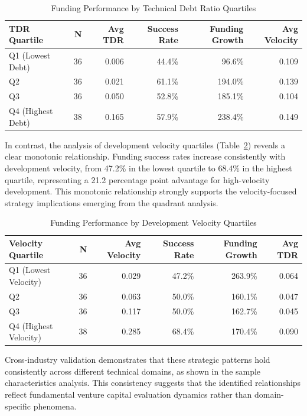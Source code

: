 \begin{table}[htbp]
\centering
\caption{Funding Performance by Technical Debt Ratio Quartiles}
\label{tab:funding_by_tdr}
\begin{tabular}{lrrrrr}
\hline
\textbf{TDR Quartile} & \textbf{N} & \textbf{Avg TDR} & \textbf{Success Rate} & \textbf{Funding Growth} & \textbf{Avg Velocity} \\
\hline
Q1 (Lowest Debt) & 36 & 0.006 & 44.4\% & 96.6\% & 0.109 \\
Q2 & 36 & 0.021 & 61.1\% & 194.0\% & 0.139 \\
Q3 & 36 & 0.050 & 52.8\% & 185.1\% & 0.104 \\
Q4 (Highest Debt) & 38 & 0.165 & 57.9\% & 238.4\% & 0.149 \\
\hline
\end{tabular}
\end{table}

In contrast, the analysis of development velocity quartiles (Table~\ref{tab:funding_by_velocity}) reveals a clear monotonic relationship. Funding success rates increase consistently with development velocity, from 47.2\% in the lowest quartile to 68.4\% in the highest quartile, representing a 21.2 percentage point advantage for high-velocity development. This monotonic relationship strongly supports the velocity-focused strategy implications emerging from the quadrant analysis.

\begin{table}[htbp]
\centering
\caption{Funding Performance by Development Velocity Quartiles}
\label{tab:funding_by_velocity}
\begin{tabular}{lrrrrr}
\hline
\textbf{Velocity Quartile} & \textbf{N} & \textbf{Avg Velocity} & \textbf{Success Rate} & \textbf{Funding Growth} & \textbf{Avg TDR} \\
\hline
Q1 (Lowest Velocity) & 36 & 0.029 & 47.2\% & 263.9\% & 0.064 \\
Q2 & 36 & 0.063 & 50.0\% & 160.1\% & 0.047 \\
Q3 & 36 & 0.117 & 50.0\% & 162.7\% & 0.045 \\
Q4 (Highest Velocity) & 38 & 0.285 & 68.4\% & 170.4\% & 0.090 \\
\hline
\end{tabular}
\end{table}

Cross-industry validation demonstrates that these strategic patterns hold consistently across different technical domains, as shown in the sample characteristics analysis. This consistency suggests that the identified relationships reflect fundamental venture capital evaluation dynamics rather than domain-specific phenomena.

